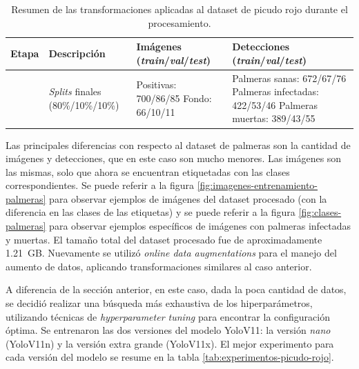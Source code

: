 \begin{table}[H]
    \centering
    \caption[Transformaciones del dataset del picudo rojo]{Resumen de las transformaciones aplicadas al dataset de picudo rojo durante el procesamiento.}
    \begin{tabularx}{\textwidth}{ >{\raggedright\arraybackslash}p{1cm} >{\raggedright\arraybackslash}X >{\raggedright\arraybackslash}X >{\raggedright\arraybackslash}X }
        \toprule
        \textbf{Etapa} & \textbf{Descripción}                     & \textbf{Imágenes \newline (\textit{train}/\textit{val}/\textit{test})} & \textbf{Detecciones \newline (\textit{train}/\textit{val}/\textit{test})}                              \\
        \midrule
        7              & \textit{Splits} finales (80\%/10\%/10\%) & Positivas: 700/86/85 \newline Fondo: 66/10/11                          & Palmeras sanas: 672/67/76 \newline Palmeras infectadas: 422/53/46 \newline Palmeras muertas: 389/43/55 \\
        \bottomrule
        \hline
    \end{tabularx}
    \label{tab:transformaciones-dataset-picudo}
\end{table}

Las principales diferencias con respecto al dataset de palmeras son la cantidad de imágenes y detecciones, que en este caso son mucho menores. Las imágenes son las mismas, solo que ahora se encuentran etiquetadas con las clases correspondientes. Se puede referir a la figura \ref{fig:imagenes-entrenamiento-palmeras} para observar ejemplos de imágenes del dataset procesado (con la diferencia en las clases de las etiquetas) y se puede referir a la figura \ref{fig:clases-palmeras} para observar ejemplos específicos de imágenes con palmeras infectadas y muertas.
El tamaño total del dataset procesado fue de aproximadamente \SI{1,21}{GB}. Nuevamente se utilizó \textit{online data augmentations} para el manejo del aumento de datos, aplicando transformaciones similares al caso anterior.

A diferencia de la sección anterior, en este caso, dada la poca cantidad de datos, se decidió realizar una búsqueda más exhaustiva de los hiperparámetros, utilizando técnicas de \textit{hyperparameter tuning} \citep{ultralytics_hyperparameter_nodate} para encontrar la configuración óptima. Se entrenaron las dos versiones del modelo YoloV11: la versión \textit{nano} (YoloV11n) y la versión extra grande (YoloV11x). El mejor experimento para cada versión del modelo se resume en la tabla \ref{tab:experimentos-picudo-rojo}.

